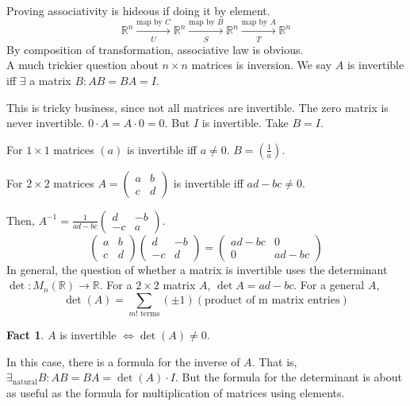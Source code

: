 \documentclass[12pt]{article}
\newcommand{\RR}{\mathbb{R}}
\theoremstyle{definition}
\newtheorem*{fact}{Fact}
\begin{document}
Proving associativity is hideous if doing it by element.
\[\RR^n\xrightarrow[U]{\text{map by } C}\RR^n\xrightarrow[S]{\text{map by } B}\RR^n\xrightarrow[T]{\text{map by } A}\RR^n\]
By composition of transformation, associative law is obvious.
\\

A much trickier question about \(n \times n\) matrices is inversion.
We say \(A\) is invertible iff \(\exists \) a matrix \(B : AB = BA = I\).

This is tricky business, since not all matrices are invertible. The zero matrix is never invertible.
\( 0\cdot A = A \cdot 0 = 0\). But \(I\) is invertible. Take \(B=I\).

For \(1 \times 1\) matrices \((a)\) is invertible iff \(a \neq 0\). \(B = (\frac{1}{a})\).

For \(2 \times 2\) matrices \(A = \left(\begin{smallmatrix}
    a & b\\
    c & d
\end{smallmatrix}\right)\) is invertible iff \(ad - bc \neq 0\).

Then, \(A^{-1}=\frac{1}{ad-bc}\left(\begin{smallmatrix}
    d & -b\\
    -c & a
\end{smallmatrix}\right)\).
\[
\begin{pmatrix}
    a & b\\
    c & d
\end{pmatrix}
\begin{pmatrix}
    d & -b\\
    -c & d
\end{pmatrix}
=
\begin{pmatrix}
    ad-bc & 0\\
    0 & ad-bc
\end{pmatrix}
\]
In general, the question of whether a matrix is invertible
uses the determinant \(\det : M_n(\RR)\rightarrow\RR \).
For a \(2 \times 2\) matrix \(A\), \(\det A = ad-bc\).
For a general \(A\), \[\det(A) = \sum_{m! \text{ terms}}(\pm1)(\text{product of m matrix entries})\]
\begin{fact}
\(A\) is invertible \(\iff \det(A)\neq 0\).
\end{fact}
In this case, there is a formula for the inverse of \(A\).
That is, \(\exists_{\text{natural}} B: AB = BA = \det(A)\cdot I\).
But the formula for the determinant is about as useful as the formula
for multiplication of matrices using elements.
\end{document}
